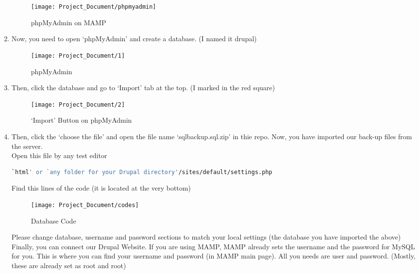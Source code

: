 \documentclass[10pt]{article}
\begin{document}
\begin{enumerate}
                    \begin{figure}[!ht]
                           \centering
                             \texttt{[image: Project\_Document/phpmyadmin]}
                        \caption{phpMyAdmin on MAMP}
                    \end{figure}

                \item Now, you need to open `phpMyAdmin' and create a database. (I named it drupal)

                    \begin{figure}[!ht]
                           \centering
                           \texttt{[image: Project\_Document/1]}
                        \caption{phpMyAdmin}
                    \end{figure}
\newpage
                \item Then, click the database and go to `Import' tab at the top. (I marked in the red square)

                    \begin{figure}[!ht]
                           \centering
                           \texttt{[image: Project\_Document/2]}
                        \caption{`Import' Button on phpMyAdmin }
                    \end{figure}

                \item Then, click the `choose the file' and open the file name `sqlbackup.sql.zip' in thie repo. Now, you have imported our back-up files from the server. \\
                Open this file by any test editor

\begin{lstlisting}[language=bash]
`html' or `any folder for your Drupal directory'/sites/default/settings.php
\end{lstlisting}

                Find this lines of the code (it is located at the very bottom) \\

                    \begin{figure}[!ht]
                           \centering
                           \texttt{[image: Project\_Document/codes]}
                        \caption{Database Code}
                    \end{figure}

                Please change database, username and password sections to match your local settings (the database you have imported the above) Finally, you can connect our Drupal Website. If you are using MAMP, MAMP already sets the username and the password for MySQL for you. This is where you can find your username and password (in MAMP main page). All you needs are user and password. (Mostly, these are already set as root and root)


\end{enumerate}
\end{document}
